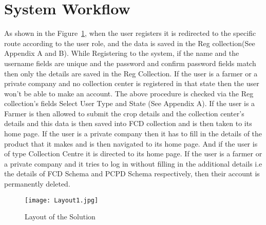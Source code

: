 \documentclass[conference]{IEEEtran}
\begin{document}
\section{System Workflow}
As shown in the Figure~\ref{fig:5}, when the user registers it is redirected to the specific route according to the user role, and the data is saved in the Reg collection(See Appendix A and B).  While Registering to the system, if the name and the username fields are unique and the password and confirm password fields match then only the details are saved in the Reg Collection.  If the user is a farmer or a private company and no collection center is registered in that state then the user won't be able to make an account. The above procedure is checked via the Reg collection's fields Select User Type and State (See Appendix A). If the user is a Farmer is then allowed to submit the crop details and the collection center's details and this data is then saved into FCD collection and is then taken to its home page. If the user is a private company then it has to fill in the details of the product that it makes and is then navigated to its home page. And if the user is of type Collection Centre it is directed to its home page. If the user is a farmer or a private company and it tries to log in without filling in the additional details i.e the details of FCD Schema and PCPD Schema respectively, then their account is permanently deleted.\\
\begin{figure}[htbp]
\centerline{\texttt{[image: Layout1.jpg]}}
\caption{Layout of the Solution}
\label{fig:5}
\end{figure}
\end{document}
